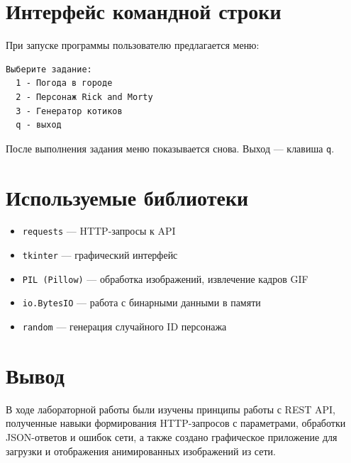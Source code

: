 \documentclass[12pt,a4paper]{article}
\begin{document}
\section*{Интерфейс командной строки}
При запуске программы пользователю предлагается меню:
\begin{lstlisting}
Выберите задание:
  1 - Погода в городе
  2 - Персонаж Rick and Morty
  3 - Генератор котиков
  q - выход
\end{lstlisting}

После выполнения задания меню показывается снова. Выход --- клавиша \texttt{q}.

\section*{Используемые библиотеки}
\begin{itemize}
    \item \texttt{requests} --- HTTP-запросы к API
    \item \texttt{tkinter} --- графический интерфейс
    \item \texttt{PIL (Pillow)} --- обработка изображений, извлечение кадров GIF
    \item \texttt{io.BytesIO} --- работа с бинарными данными в памяти
    \item \texttt{random} --- генерация случайного ID персонажа
\end{itemize}

\section*{Вывод}
В ходе лабораторной работы были изучены принципы работы с REST API, полученные навыки формирования HTTP-запросов с параметрами, обработки JSON-ответов и ошибок сети, а также создано графическое приложение для загрузки и отображения анимированных изображений из сети.
\end{document}
